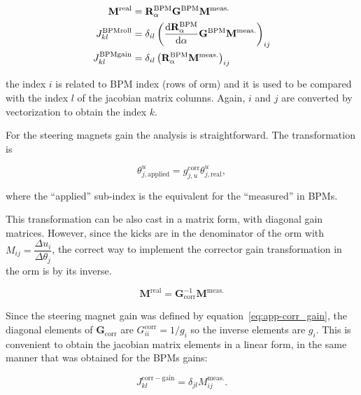 \begin{align}
    \mathbf{M}^{\mathrm{real}} &= \mathbf{R}^\mathrm{BPM}_\alpha\mathbf{G}^{\mathrm{BPM}} \mathbf{M}^{\mathrm{meas.}} \\
    J_{kl}^{\mathrm{BPMroll}} &= \delta_{il}\left(\dfrac{\mathrm{d} \mathbf{R}^\mathrm{BPM}_{\alpha}}{\mathrm{d} \alpha}\mathbf{G}^{\mathrm{BPM}} \mathbf{M}^{\mathrm{meas.}}\right)_{ij} \\
    J_{kl}^{\mathrm{BPMgain}} &= \delta_{il}\left(\mathbf{R}^\mathrm{BPM}_\alpha \mathbf{M}^{\mathrm{meas.}}\right)_{ij}
\end{align}

the index $i$ is related to BPM index (rows of \gls{orm}) and it is used to be compared with the index $l$ of the jacobian matrix columns. Again, $i$ and $j$ are converted by vectorization to obtain the index $k$.

For the steering magnets gain the analysis is straightforward. The transformation is

\begin{equation}
    \theta_{j, \mathrm{applied}}^u = g_{j, u}^{\mathrm{corr}}\theta_{j, \mathrm{real}}^u,
    \label{eq:app-corr_gain}
\end{equation}

where the ``applied'' sub-index is the equivalent for the ``measured'' in BPMs.

This transformation can be also cast in a matrix form, with diagonal gain matrices. However, since the kicks are in the denominator of the \gls{orm} with $M_{ij} = \dfrac{\Delta u_i}{\Delta \theta_j}$, the correct way to implement the corrector gain transformation in the \gls{orm} is by its inverse. 

\begin{equation}
        \mathbf{M}^{\mathrm{real}} = \mathbf{G}^{-1}_{\mathrm{corr}} \mathbf{M}^{\mathrm{meas.}}
\end{equation}

Since the steering magnet gain was defined by equation~\eqref{eq:app-corr_gain}, the diagonal elements of $\mathbf{G}_{\mathrm{corr}}$ are $G^{\mathrm{corr}}_{ii} = 1/g_{i}$ so the inverse elements are $g_{i}$. This is convenient to obtain the jacobian matrix elements in a linear form, in the same manner that was obtained for the BPMs gains:

\begin{equation}
    J_{kl}^{\mathrm{corr}-\mathrm{gain}} = \delta_{jl}M^{\mathrm{meas.}}_{ij}.
\end{equation}

